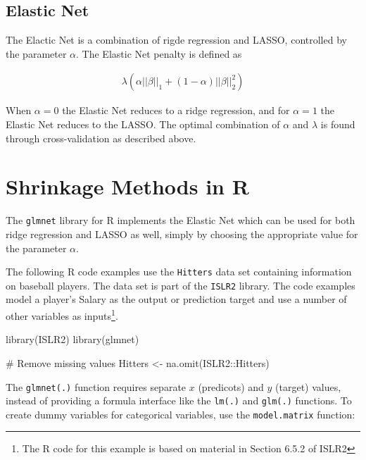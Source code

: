 \subsection{Elastic Net}

The Elactic Net is a combination of rigde regression and LASSO, controlled by the parameter $\alpha$. The Elastic Net penalty is defined as

\begin{align*}
\lambda \left( \alpha ||\beta||_1  + (1-\alpha)||\beta||_2^2 \right)
\end{align*}

When $\alpha=0$ the Elastic Net reduces to a ridge regression, and for $\alpha=1$ the Elastic Net reduces to the LASSO. The optimal combination of $\alpha$ and $\lambda$ is found through cross-validation as described above.


\section{Shrinkage Methods in R}

The \texttt{glmnet} library for R implements the Elastic Net which can be used for both ridge regression and LASSO as well, simply by choosing the appropriate value for the parameter $\alpha$.

The following R code examples use the \texttt{Hitters} data set containing information on baseball players. The data set is part of the \texttt{ISLR2} library. The code examples model a player's Salary as the output or prediction target and use a number of other variables as inputs\footnote{The R code for this example is based on material in Section 6.5.2 of ISLR2}. 

\begin{samepage}
\begin{Rcode}
library(ISLR2)
library(glmnet)

# Remove missing values
Hitters <- na.omit(ISLR2::Hitters)
\end{Rcode}
\end{samepage}

The \texttt{glmnet(.)} function requires separate $x$ (predicots) and $y$  (target) values, instead of providing a formula interface like the \texttt{lm(.)} and \texttt{glm(.)} functions. To create dummy variables for categorical variables, use the \texttt{model.matrix} function:

\begin{samepage}
\end{samepage}

